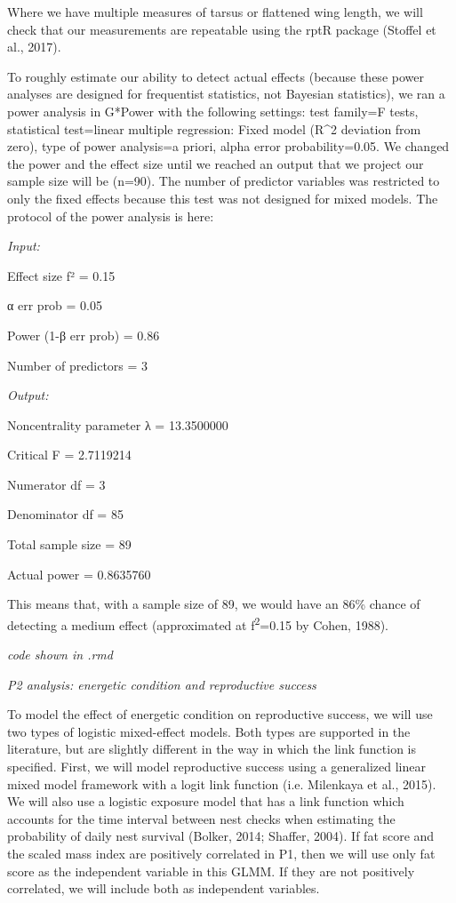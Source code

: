 \documentclass[
]{article}
\begin{document}
Where we have multiple measures of tarsus or flattened wing length, we
will check that our measurements are repeatable using the rptR package
(Stoffel et al., 2017).

To roughly estimate our ability to detect actual effects (because these
power analyses are designed for frequentist statistics, not Bayesian
statistics), we ran a power analysis in G*Power with the following
settings: test family=F tests, statistical test=linear multiple
regression: Fixed model (R\^{}2 deviation from zero), type of power
analysis=a priori, alpha error probability=0.05. We changed the power
and the effect size until we reached an output that we project our
sample size will be (n=90). The number of predictor variables was
restricted to only the fixed effects because this test was not designed
for mixed models. The protocol of the power analysis is here:

\emph{Input:}

Effect size f² = 0.15

α err prob = 0.05

Power (1-β err prob) = 0.86

Number of predictors = 3

\emph{Output:}

Noncentrality parameter λ = 13.3500000

Critical F = 2.7119214

Numerator df = 3

Denominator df = 85

Total sample size = 89

Actual power = 0.8635760

This means that, with a sample size of 89, we would have an 86\% chance
of detecting a medium effect (approximated at f\textsuperscript{2}=0.15
by Cohen, 1988).

\emph{code shown in .rmd}

\emph{P2 analysis: energetic condition and reproductive success}

To model the effect of energetic condition on reproductive success, we
will use two types of logistic mixed-effect models. Both types are
supported in the literature, but are slightly different in the way in
which the link function is specified. First, we will model reproductive
success using a generalized linear mixed model framework with a logit
link function (i.e. Milenkaya et al., 2015). We will also use a logistic
exposure model that has a link function which accounts for the time
interval between nest checks when estimating the probability of daily
nest survival (Bolker, 2014; Shaffer, 2004). If fat score and the scaled
mass index are positively correlated in P1, then we will use only fat
score as the independent variable in this GLMM. If they are not
positively correlated, we will include both as independent variables.
\end{document}
